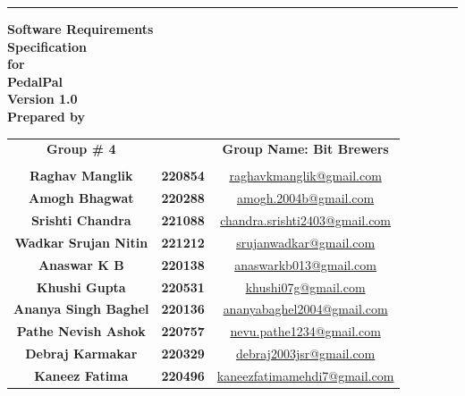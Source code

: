 \documentclass[11pt]{article}
\begin{document}
\begin{titlingpage}
\begin{flushright}
    \rule{16cm}{5pt}\vskip1cm
    \textbf{{\fontsize{30}{36}\selectfont Software Requirements}\\ {\fontsize{30}{36}\selectfont Specification}\\\vspace{1cm}\huge{for}\\\vspace{1cm}\Huge{PedalPal}\\ \vspace{1.5cm}\LARGE{Version 1.0}\\\vspace{1cm}\LARGE{Prepared by}}
\end{flushright}
\vspace{1.0cm}
\large{\begin{tabular*}{\columnwidth}{@{\extracolsep{\stretch{1}}}*{3}{c}@{}}
    \Large{\textbf{Group \# 4}} & & \Large{\textbf{Group Name: Bit Brewers}} \\
    \\
    \textbf{Raghav Manglik} & \textbf{220854} & \href{mailto:raghavkmanglik@gmail.com}{raghavkmanglik@gmail.com} \\
    \textbf{Amogh Bhagwat} & \textbf{220288} & \href{mailto:amogh.2004b@gmail.com}{amogh.2004b@gmail.com} \\
    \textbf{Srishti Chandra} & \textbf{221088} & \href{mailto:chandra.srishti2403@gmail.com}{chandra.srishti2403@gmail.com} \\
    \textbf{Wadkar Srujan Nitin} & \textbf{221212} & \href{mailto:srujanwadkar@gmail.com}{srujanwadkar@gmail.com} \\
    \textbf{Anaswar K B} & \textbf{220138} & \href{mailto:anaswarkb013@gmail.com}{anaswarkb013@gmail.com} \\
    \textbf{Khushi Gupta} & \textbf{220531} & \href{mailto:khushi07g@gmail.com}{khushi07g@gmail.com} \\
    \textbf{Ananya Singh Baghel} & \textbf{220136} & \href{mailto:ananyabaghel2004@gmail.com}{ananyabaghel2004@gmail.com} \\
    \textbf{Pathe Nevish Ashok} & \textbf{220757} & \href{mailto:nevu.pathe1234@gmail.com}{nevu.pathe1234@gmail.com} \\
    \textbf{Debraj Karmakar} & \textbf{220329} & \href{mailto:debraj2003jsr@gmail.com}{debraj2003jsr@gmail.com} \\
    \textbf{Kaneez Fatima} & \textbf{220496} & \href{mailto:kaneezfatimamehdi7@gmail.com}{kaneezfatimamehdi7@gmail.com} \\
    

\end{tabular*}}
\end{titlingpage}
\end{document}

